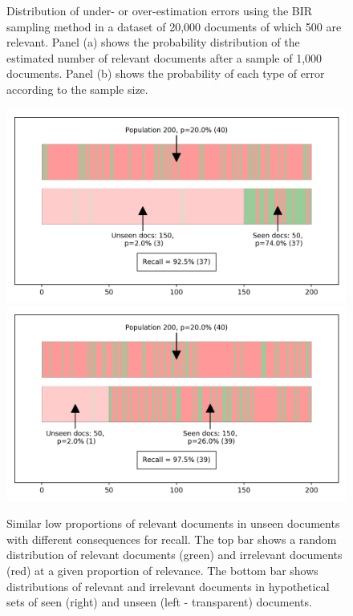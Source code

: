 \documentclass{bmcart}
\providecommand{\DIFaddbeginFL}{} %
\providecommand{\DIFaddendFL}{} %
\providecommand{\DIFdelbeginFL}{} %
\providecommand{\DIFdelendFL}{} %
\newcommand{\DIFscaledelfig}{0.5}
\newlength{\DIFdelgraphicswidth} %
\newlength{\DIFdelgraphicsheight} %
\newcommand{\DIFaddincludegraphics}[2][]{{\color{blue}\fbox{\DIFOincludegraphics[#1]{#2}}}} %
\newcommand{\DIFdelincludegraphics}[2][]{%
\sbox{\DIFdelgraphicsbox}{\DIFOincludegraphics[#1]{#2}}%
\settoboxwidth{\DIFdelgraphicswidth}{\DIFdelgraphicsbox} %
\settoboxtotalheight{\DIFdelgraphicsheight}{\DIFdelgraphicsbox} %
\scalebox{\DIFscaledelfig}{%
\parbox[b]{\DIFdelgraphicswidth}{\usebox{\DIFdelgraphicsbox}\\[-\baselineskip] \rule{\DIFdelgraphicswidth}{0em}}\llap{\resizebox{\DIFdelgraphicswidth}{\DIFdelgraphicsheight}{%
\setlength{\unitlength}{\DIFdelgraphicswidth}%
\begin{picture}(1,1)%
\thicklines\linethickness{2pt} %
{\color[rgb]{1,0,0}\put(0,0){\framebox(1,1){}}}%
{\color[rgb]{1,0,0}\put(0,0){\line( 1,1){1}}}%
{\color[rgb]{1,0,0}\put(0,1){\line(1,-1){1}}}%
\end{picture}%
}\hspace*{3pt}}} %
} %
\DeclareRobustCommand{\DIFaddbeginFL}{\DIFOaddbeginFL \let\includegraphics\DIFaddincludegraphics} %
\DeclareRobustCommand{\DIFaddendFL}{\DIFOaddendFL \let\includegraphics\DIFOincludegraphics} %
\DeclareRobustCommand{\DIFdelbeginFL}{\DIFOdelbeginFL \let\includegraphics\DIFdelincludegraphics} %
\DeclareRobustCommand{\DIFdelendFL}{\DIFOaddendFL \let\includegraphics\DIFOincludegraphics} %
\begin{document}
\begin{figure}
		\caption{\small Distribution of under- or over-estimation errors using the BIR sampling method in a dataset of 20,000 documents of which 500 are relevant. Panel (a) shows the probability distribution of the estimated number of relevant documents after a sample of 1,000 documents. Panel (b) shows the probability of each type of error according to the sample size.} 
		\label{bir-sampling}
	\end{figure}

	\begin{figure}
		\DIFdelbeginFL %
\DIFdelendFL \DIFaddbeginFL \includegraphics[width=\linewidth]{2_figs_proportions_1.png}
		\includegraphics[width=\linewidth]{2_figs_proportions_2.png}
		\DIFaddendFL \caption{Similar low proportions of relevant documents in unseen documents with different consequences for recall. The top bar shows a random distribution of relevant documents (green) and irrelevant documents (red) at a given proportion of relevance. The bottom bar  shows distributions of relevant and irrelevant documents in hypothetical sets of seen (right) and unseen (left - transparent) documents.}
		\label{unseen-proportions}
	\end{figure}
\end{document}
